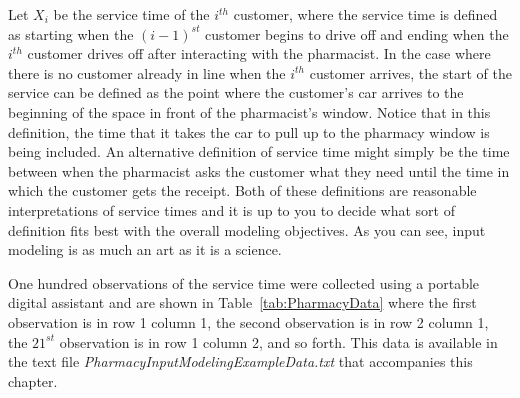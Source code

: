 \documentclass[
]{book}
\theoremstyle{definition}
\theoremstyle{definition}
\theoremstyle{definition}
\theoremstyle{definition}
\theoremstyle{remark}
\begin{document}
Let \emph{\(X_i\)} be the service time of the \(i^{th}\) customer, where the service
time is defined as starting when the \((i - 1)^{st}\) customer begins to
drive off and ending when the \(i^{th}\) customer drives off after
interacting with the pharmacist. In the case where there is no customer
already in line when the \(i^{th}\) customer arrives, the start of the
service can be defined as the point where the customer's car arrives to
the beginning of the space in front of the pharmacist's window. Notice
that in this definition, the time that it takes the car to pull up to
the pharmacy window is being included. An alternative definition of
service time might simply be the time between when the pharmacist asks
the customer what they need until the time in which the customer gets
the receipt. Both of these definitions are reasonable interpretations of
service times and it is up to you to decide what sort of definition fits
best with the overall modeling objectives. As you can see, input
modeling is as much an art as it is a science.

One hundred observations of the service time were collected using a
portable digital assistant and are shown in
Table~\ref{tab:PharmacyData} where the first observation is in row 1
column 1, the second observation is in row 2 column 1, the \(21^{st}\)
observation is in row 1 column 2, and so forth. This data is available
in the text file \emph{PharmacyInputModelingExampleData.txt} that accompanies
this chapter.
\end{document}
